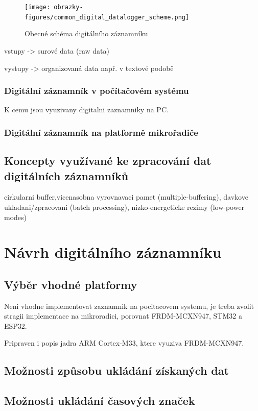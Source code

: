 \begin{figure}[h] %
    \centering
    \texttt{[image: obrazky-figures/common\_digital\_datalogger\_scheme.png]}
    \caption{Obecné schéma digitálního záznamníku}
    \label{fig:polygraaf}
\end{figure}
vstupy -> surové data (raw data)

vystupy -> organizovaná data např. v textové podobě

\subsection{Digitální záznamník v počítačovém systému}
K cemu jsou vyuzivany digitalni zaznamniky na PC.

\subsection{Digitální záznamník na platformě mikrořadiče}

\section{Koncepty využívané ke zpracování dat digitálních záznamníků}
cirkularni buffer,vicenasobna vyrovnavaci pamet (multiple-buffering), davkove ukladani/zpracovani (batch processing), nizko-energeticke rezimy (low-power modes)
\chapter{Návrh digitálního záznamníku}

\section{Výběr vhodné platformy}
Neni vhodne implementovat zaznamnik na pocitacovem systemu, je treba zvolit stragii implementace na mikroradici, porovnat FRDM-MCXN947, STM32 a ESP32. 

Pripraven i popis jadra ARM Cortex-M33, ktere vyuziva FRDM-MCXN947.

\section{Možnosti způsobu ukládání získaných dat}

\section{Možnosti ukládání časových značek}

